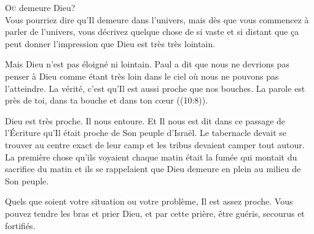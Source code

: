 


\lettrine{O}{ù} demeure Dieu? \\[1ex]
Vous pourriez dire qu'Il demeure dans l'univers,
 mais dès que vous commencez à parler de l'univers,
 vous décrivez quelque chose de si vaste et si distant
 que \c{c}a peut donner l'impression que Dieu est très très lointain.

Mais Dieu n'est pas éloigné ni lointain.
 Paul a dit que nous ne devrions pas penser à Dieu comme étant très loin
 dans le ciel où nous ne pouvons pas l'atteindre.
 La vérité, c'est qu'Il est aussi proche que nos bouches.
 \Og La parole est près de toi, dans ta bouche et dans ton c\oe{}ur \Fg{}
 ((10:8)).

Dieu est très proche. Il nous entoure.
 Et Il nous est dit dans ce passage de l'Écriture
 qu'Il était proche de Son peuple d'Israël.
 Le tabernacle devait se trouver au centre exact de leur camp
 et les tribus devaient camper tout autour.
 La première chose qu'ils voyaient chaque matin était la fumée
 qui montait du sacrifice du matin
 \ocadr{}et ils se rappelaient que Dieu demeure en plein au milieu de Son peuple.


Quels que soient votre situation ou votre problème, Il est assez proche.
 Vous pouvez tendre les bras et prier Dieu, et par cette prière,
 être guéris, secourus et fortifiés. 

\dvrule







